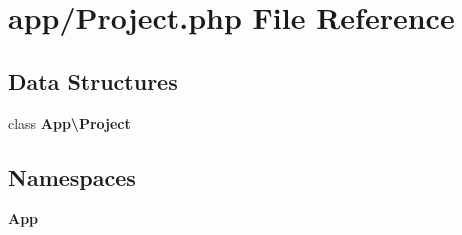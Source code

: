 \section{app/\+Project.php File Reference}
\label{app_2_project_8php}
\subsection*{Data Structures}
\begin{DoxyCompactItemize}
\item 
class {\bf App\textbackslash{}\+Project}
\end{DoxyCompactItemize}
\subsection*{Namespaces}
\begin{DoxyCompactItemize}
\item 
 {\bf App}
\end{DoxyCompactItemize}

